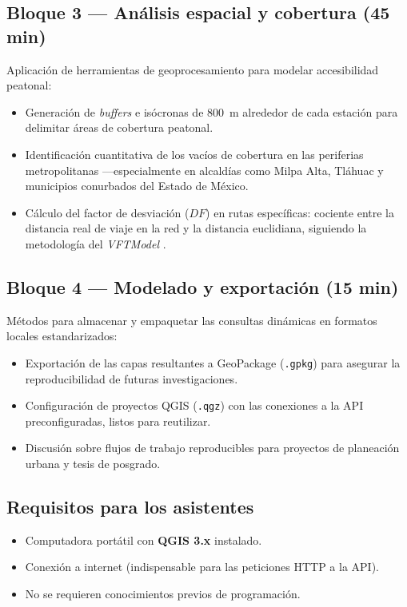 \subsection{Bloque 3 — Análisis espacial y cobertura (45 min)}

Aplicación de herramientas de geoprocesamiento para modelar accesibilidad
peatonal:

\begin{itemize}[nosep, leftmargin=1.5em]
  \item Generación de \textit{buffers} e isócronas de 800~m alrededor de cada
    estación para delimitar áreas de cobertura peatonal.
  \item Identificación cuantitativa de los vacíos de cobertura en las periferias
    metropolitanas ---especialmente en alcaldías como Milpa Alta, Tláhuac y
    municipios conurbados del Estado de México.
  \item Cálculo del factor de desviación ($DF$) en rutas específicas: cociente
    entre la distancia real de viaje en la red y la distancia euclidiana,
    siguiendo la metodología del \textit{VFTModel}
    \citep{garibaldi2026vft}.
\end{itemize}

\subsection{Bloque 4 — Modelado y exportación (15 min)}

Métodos para almacenar y empaquetar las consultas dinámicas en formatos locales
estandarizados:

\begin{itemize}[nosep, leftmargin=1.5em]
  \item Exportación de las capas resultantes a GeoPackage (\texttt{.gpkg}) para
    asegurar la reproducibilidad de futuras investigaciones.
  \item Configuración de proyectos QGIS (\texttt{.qgz}) con las conexiones a
    la API preconfiguradas, listos para reutilizar.
  \item Discusión sobre flujos de trabajo reproducibles para proyectos de
    planeación urbana y tesis de posgrado.
\end{itemize}

\subsection{Requisitos para los asistentes}

\begin{itemize}[nosep, leftmargin=1.5em]
  \item Computadora portátil con \textbf{QGIS 3.x} instalado.
  \item Conexión a internet (indispensable para las peticiones HTTP a la API).
  \item No se requieren conocimientos previos de programación.
\end{itemize}
